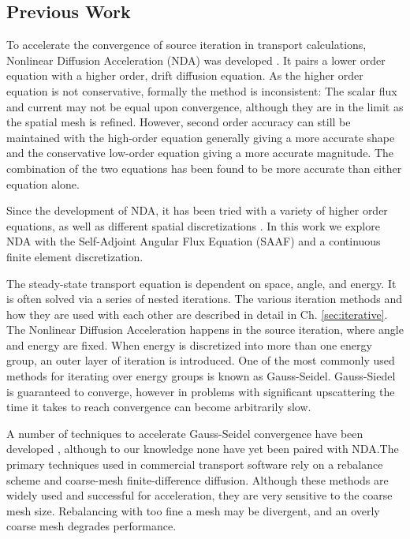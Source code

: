 \subsection{Previous Work}
To accelerate the convergence of source iteration in transport calculations, Nonlinear Diffusion Acceleration (NDA) was developed \cite{Knoll2011} \cite{park-nda}. It pairs a lower order equation with a higher order, drift diffusion equation. As the higher order equation is not conservative, formally the method is inconsistent: The scalar flux and current may not be equal upon convergence, although they are in the limit as the spatial mesh is refined. However, second order accuracy can still be maintained with the high-order equation generally giving a more accurate shape and the conservative low-order equation giving a more accurate magnitude. The combination of the two equations has been found to be more accurate than either equation alone. \cite{morel-holo} \par
Since the development of NDA, it has been tried with a variety of higher order equations, \cite{morel-holo}\cite{Wang2013} as well as different spatial discretizations \cite{morel-holo}\cite{Schunert2017}. In this work we explore NDA with the Self-Adjoint Angular Flux Equation (SAAF) and a continuous finite element discretization. \par
The steady-state transport equation is dependent on space, angle, and energy. It is often solved via a series of nested iterations. The various iteration methods and how they are used with each other are described in detail in Ch. \ref{sec:iterative}. The Nonlinear Diffusion Acceleration happens in the source iteration, where angle and energy are fixed. When energy is discretized into more than one energy group, an outer layer of iteration is introduced. One of the most commonly used methods for iterating over energy groups is known as Gauss-Seidel. Gauss-Siedel is guaranteed to converge, however in problems with significant upscattering the time it takes to reach convergence can become arbitrarily slow. 
\par
A number of techniques to accelerate Gauss-Seidel convergence have been developed \cite{morel-upscat} \cite{evans-upscat}, although to our knowledge none have yet been paired with NDA.The primary techniques used in commercial transport software rely on a rebalance scheme and coarse-mesh finite-difference diffusion. Although these methods are widely used and successful for acceleration, they are very sensitive to the coarse mesh size. Rebalancing with too fine a mesh may be divergent, and an overly coarse mesh degrades performance. \cite{evans-upscat}
